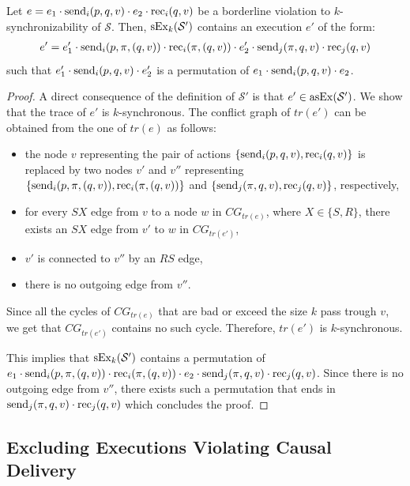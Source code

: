 \begin{lemma}
Let $e=e_1\cdot \send{i}{p,q,v}\cdot e_2\cdot \rec{i}{q,v}$ be a borderline violation to $k$-synchronizability of $\mathcal{S}$. Then, $\synchExec{\mathcal{S'}}{k}$ contains an execution $e'$ of the form: 
\begin{align*}
e'=e_1'\cdot \send{i}{p,\pi,(q,v)}\cdot \rec{i}{\pi,(q,v)}\cdot e_2'\cdot \send{j}{\pi,q,v}\cdot \rec{j}{q,v}
\end{align*}
such that $e_1'\cdot \send{i}{p,q,v} \cdot e_2'$ is a permutation of $e_1\cdot \send{i}{p,q,v}\cdot e_2$.
\end{lemma}
\begin{proof}
A direct consequence of the definition of $\mathcal{S'}$ is that $e'\in\asynchExec{\mathcal{S'}}$. We show that the trace of $e'$ is $k$-synchronous. The conflict graph of $tr(e')$ can be obtained from the one of $tr(e)$ as follows:
\begin{itemize}
	\item the node $v$ representing the pair of actions $\{\send{i}{p,q,v},\rec{i}{q,v}\}$ is replaced by two nodes $v'$ and $v''$ representing $\{\send{i}{p,\pi,(q,v)}, \rec{i}{\pi,(q,v)}\}$ and $\{\send{j}{\pi,q,v}, \rec{j}{q,v}\}$, respectively,
	\item for every $SX$ edge from $v$ to a node $w$ in $CG_{tr(e)}$, where $X\in\{S,R\}$, there exists an $SX$ edge from $v'$ to $w$ in $CG_{tr(e')}$,
	\item $v'$ is connected to $v''$ by an $RS$ edge,
	\item there is no outgoing edge from $v''$.
\end{itemize}
Since all the cycles of $CG_{tr(e)}$ that are bad or exceed the size $k$ pass trough $v$, we get that $CG_{tr(e')}$ contains no such cycle.
Therefore, $tr(e')$ is $k$-synchronous. 

This implies that $\synchExec{\mathcal{S'}}{k}$ contains a permutation of $e_1\cdot \send{i}{p,\pi,(q,v)}\cdot \rec{i}{\pi,(q,v)}\cdot e_2\cdot \send{j}{\pi,q,v}\cdot \rec{j}{q,v}$. Since there is no outgoing edge from $v''$, there exists such a permutation that ends in $\send{j}{\pi,q,v}\cdot \rec{j}{q,v}$ which concludes the proof.
\end{proof}

\subsection{Excluding Executions Violating Causal Delivery}\label{ssec:verif3}


